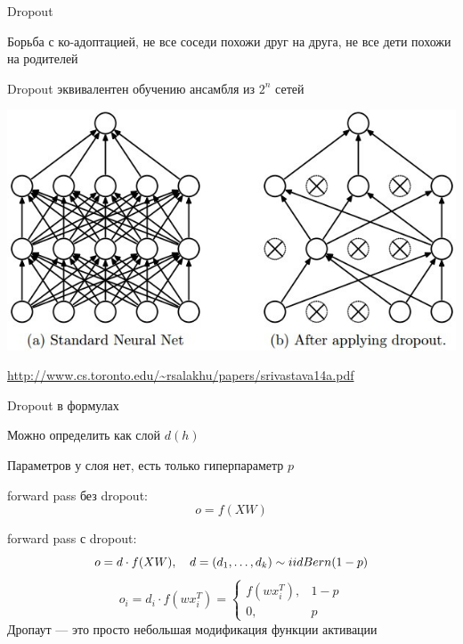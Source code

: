 \documentclass[notes,12pt, aspectratio=169]{beamer}
\newenvironment{wideitemize}{\itemize\addtolength{\itemsep}{10pt}}{\enditemize}
\begin{document}
\begin{frame}{Dropout}
	\begin{wideitemize}	
		\item Борьба с ко-адоптацией, не все соседи похожи  друг на друга, не все дети похожи  на родителей
		\item  Dropout эквивалентен обучению ансамбля из $2^n$ сетей
	\end{wideitemize}
	
	\begin{center}
		\includegraphics[width=0.5\paperwidth]{dropout2.png}
	\end{center}
	
	\vfill %
	\footnotesize
	{\color{blue} \url{http://www.cs.toronto.edu/~rsalakhu/papers/srivastava14a.pdf}}
\end{frame}


\begin{frame}{Dropout в формулах} 
	\begin{wideitemize}
		\item  Можно определить как слой $d(h)$ 
		\item  Параметров у слоя нет, есть только гиперпараметр $p$
		\pause 
		\item  	forward pass без dropout:  \[o = f(XW)\]
		\item  	forward pass с dropout:  \[o = d \cdot f(XW), \quad d = (d_1, \ldots, d_k)  \sim iid \vspace{10mm} Bern(1 - p)\]
		\pause 	
	\end{wideitemize}
	\[
	o_i = d_i \cdot f(w x_i^T) = \begin{cases} f(w x_i^T) , & 1-p \\ 0,  & p \end{cases}
	\]	
	\vfill 
	\alert{Дропаут — это просто небольшая модификация функции активации}
\end{frame}
\end{document}
